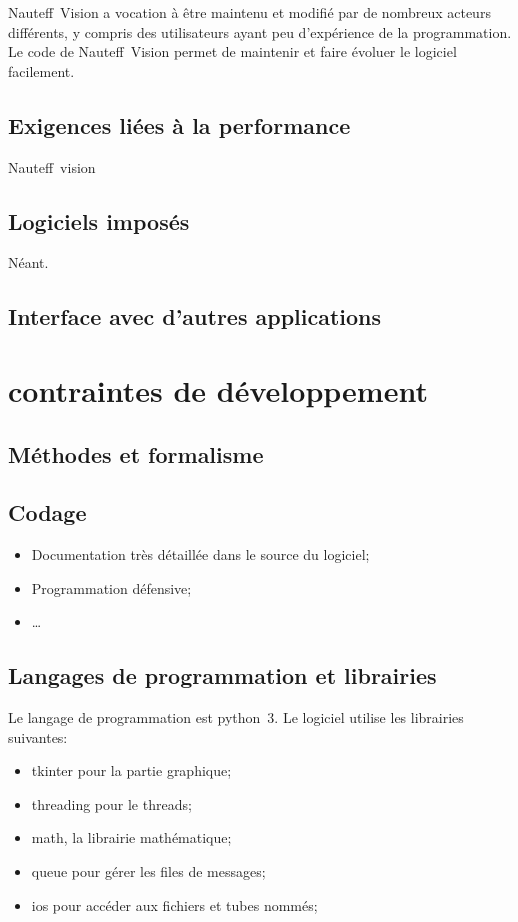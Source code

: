 \documentclass[a4paper,11pt]{report}
\begin{document}
Nauteff~Vision a vocation à être maintenu et modifié par de nombreux
acteurs différents, y compris des utilisateurs ayant peu d'expérience
de la programmation. Le code de Nauteff~Vision permet de maintenir et
faire évoluer le logiciel facilement.

\subsection{Exigences liées à la performance}
Nauteff~vision 

\subsection{Logiciels imposés}
Néant.
\subsection{Interface avec d'autres applications}

\section{contraintes de développement}
\subsection{Méthodes et formalisme}

\subsection{Codage}

\begin{itemize}
    \item Documentation très détaillée dans le source du logiciel;
    \item Programmation défensive;
    \item \dots
\end{itemize}

\subsection{Langages de programmation et librairies}
Le langage de programmation est python~3.
Le logiciel utilise les librairies suivantes:
\begin{itemize}
	\item tkinter pour la partie graphique;
	\item threading pour le threads;
	\item math, la librairie mathématique;
	\item queue pour gérer les files de messages;
	\item ios pour accéder aux fichiers et tubes nommés;
\end{itemize}
\end{document}
